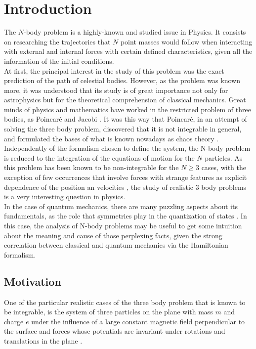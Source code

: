 \chapter{Introduction}
The $N$-body problem is a highly-known and studied issue in Physics. It consists on researching the trajectories that $N$ point masses would follow when interacting with external and internal forces with certain defined characteristics, given all the information of the initial conditions.\\

At first, the principal interest in the study of this problem was the exact prediction of the path of celestial bodies. However, as the problem was known more, it was understood that its study is of great importance not only for astrophysics but for the theoretical comprehension of classical mechanics. Great minds of physics and mathematics have worked in the restricted problem of three bodies, as Poincar\'e \cite{introPoincare} and Jacobi \cite{introJacobi}. It was this way that Poincar\'e, in an attempt of solving the three body problem, discovered that it is not integrable in general, and formulated the bases of what is known nowadays as chaos theory \cite{introPoincare}.\\

Independently of the formalism chosen to define the system, the N-body problem is reduced to the integration of the equations of motion for the $N$ particles. As this problem has been known to be non-integrable for the $N\geq 3$ cases, with the exception of few occurrences that involve forces with strange features as explicit dependence of the position an velocities \cite{strangeCases}, the study of realistic 3 body problems is a very interesting question in physics.\\

In the case of quantum mechanics, there are many puzzling aspects about its fundamentals, as the role that symmetries play in the quantization of states \cite{haldane3}. In this case, the analysis of N-body problems may be useful to get some intuition about the meaning and cause of those perplexing facts, given the strong correlation between classical and quantum mechanics via the Hamiltonian formalism.\\

\section{Motivation}
One of the particular realistic cases of the three body problem that is known to be integrable, is the system of three particles on the plane with mass $m$ and charge $e$ under the influence of a large constant magnetic field perpendicular to the surface and forces whose potentials are invariant under rotations and translations in the plane \cite{alonso}.\\

